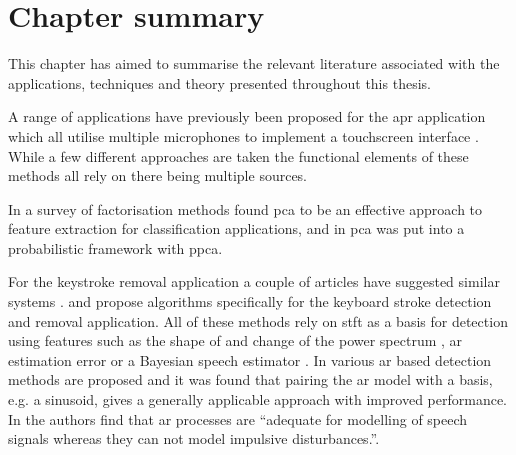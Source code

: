%






\section{Chapter summary}
This chapter has aimed to summarise the relevant literature associated with the applications, techniques and theory presented throughout this thesis.

A range of applications have previously been proposed for the \gls{apr} application which all utilise multiple microphones to implement a touchscreen interface \cite{US8174547}\linebreak[0]\cite{US8233353}\linebreak[0]\cite{TouchSystems2006}\cite{US7411581}\cite{WO2006108443}. While a few different approaches are taken the functional elements of these methods all rely on there being multiple sources.

In \cite{Burke2013} a survey of factorisation methods found \gls{pca} to be an effective approach to feature extraction for classification applications, and in \cite{Tipping1999} \gls{pca} was put into a probabilistic framework with \gls{ppca}.

For the keystroke removal application a couple of articles have suggested similar systems \cite{Subramanya2007}\cite{Sugiyama2007}\cite{Abramson2007}. \cite{Subramanya2007} and \cite{Sugiyama2007} propose algorithms specifically for the keyboard stroke detection and removal application. All of these methods rely on \gls{stft} as a basis for detection using features such as the shape of and change of the power spectrum \cite{Sugiyama2007}, \gls{ar} estimation error \cite{Subramanya2007}\cite{Kauppinen2002} or a Bayesian speech estimator \cite{Abramson2007}. In \cite{Godsill1998book} various \gls{ar} based detection methods are proposed and it was found that pairing the \gls{ar} model with a basis, e.g. a sinusoid, gives a generally applicable approach with improved performance. In \cite{Vaseghi1990} the authors find that \gls{ar} processes are ``adequate for modelling of speech signals whereas they can not model impulsive disturbances.''.

